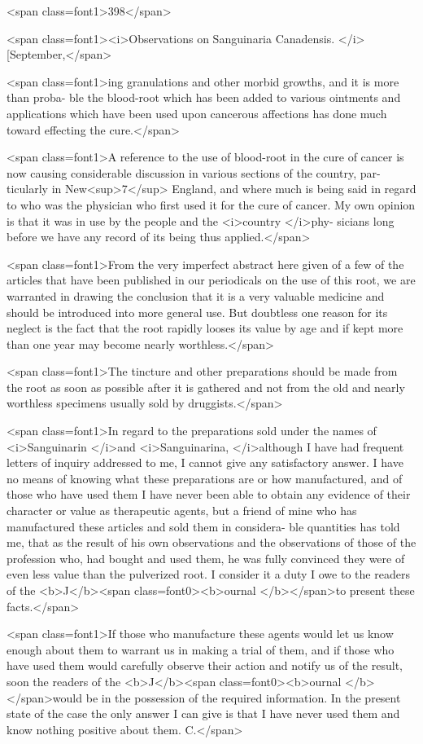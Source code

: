 <span class=font1>398</span>

<span class=font1><i>Observations on Sanguinaria Canadensis. </i>[September,</span>

<span class=font1>ing granulations and other morbid growths, and it is more than proba-
ble the blood-root which has been added to various ointments and
applications which have been used upon cancerous affections has done
much toward effecting the cure.</span>

<span class=font1>A reference to the use of blood-root in the cure of cancer is now
causing considerable discussion in various sections of the country, par-
ticularly in New<sup>7</sup> England, and where much is being said in regard to
who was the physician who first used it for the cure of cancer. My
own opinion is that it was in use by the people and the <i>country </i>phy-
sicians long before we have any record of its being thus applied.</span>

<span class=font1>From the very imperfect abstract here given of a few of the articles
that have been published in our periodicals on the use of this root, we are
warranted in drawing the conclusion that it is a very valuable medicine
and should be introduced into more general use. But doubtless one
reason for its neglect is the fact that the root rapidly looses its value by
age and if kept more than one year may become nearly worthless.</span>

<span class=font1>The tincture and other preparations should be made from the root as
soon as possible after it is gathered and not from the old and nearly
worthless specimens usually sold by druggists.</span>

<span class=font1>In regard to the preparations sold under the names of <i>Sanguinarin
</i>and <i>Sanguinarina, </i>although I have had frequent letters of inquiry
addressed to me, I cannot give any satisfactory answer. I have no
means of knowing what these preparations are or how manufactured,
and of those who have used them I have never been able to obtain any
evidence of their character or value as therapeutic agents, but a friend
of mine who has manufactured these articles and sold them in considera-
ble quantities has told me, that as the result of his own observations
and the observations of those of the profession who, had bought and
used them, he was fully convinced they were of even less value than
the pulverized root. I consider it a duty I owe to the readers of the
<b>J</b><span class=font0><b>ournal </b></span>to present these facts.</span>

<span class=font1>If those who manufacture these agents would let us know enough
about them to warrant us in making a trial of them, and if those who
have used them would carefully observe their action and notify us of
the result, soon the readers of the <b>J</b><span class=font0><b>ournal </b></span>would be in the possession
of the required information. In the present state of the case the only
answer I can give is that I have never used them and know nothing
positive about them. C.</span>

